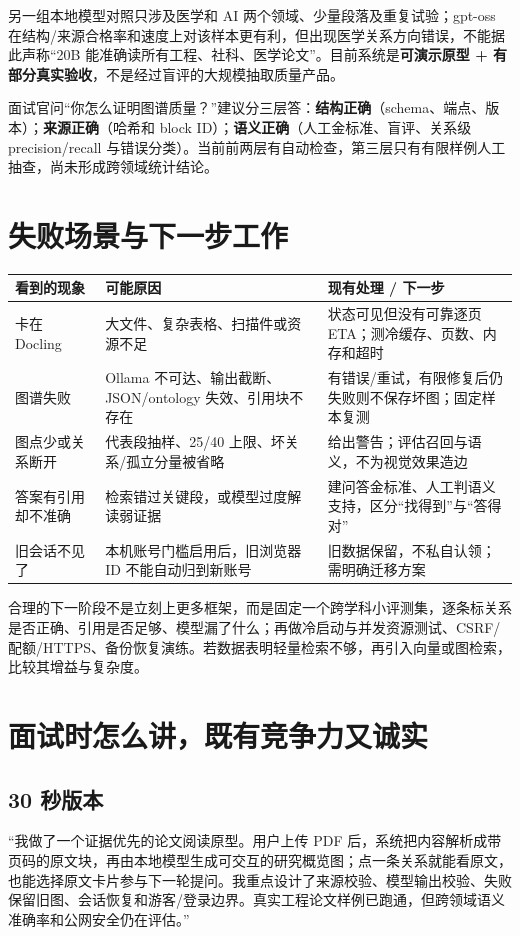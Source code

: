 \documentclass[UTF8,11pt,a4paper,fontset=fandol]{ctexart}
\newcommand{\term}[1]{\textbf{#1}}
\begin{document}
另一组本地模型对照只涉及医学和 AI 两个领域、少量段落及重复试验；gpt-oss 在结构/来源合格率和速度上对该样本更有利，但出现医学关系方向错误，不能据此声称“20B 能准确读所有工程、社科、医学论文”。目前系统是\term{可演示原型 + 有部分真实验收}，不是经过盲评的大规模抽取质量产品。

\begin{practicebox}
面试官问“你怎么证明图谱质量？”建议分三层答：\textbf{结构正确}（schema、端点、版本）；\textbf{来源正确}（哈希和 block ID）；\textbf{语义正确}（人工金标准、盲评、关系级 precision/recall 与错误分类）。当前前两层有自动检查，第三层只有有限样例人工抽查，尚未形成跨领域统计结论。
\end{practicebox}

\section{失败场景与下一步工作}

\begin{tabularx}{\textwidth}{@{}p{38mm}Y Y@{}}
\toprule
看到的现象 & 可能原因 & 现有处理 / 下一步 \\
\midrule
卡在 Docling & 大文件、复杂表格、扫描件或资源不足 & 状态可见但没有可靠逐页 ETA；测冷缓存、页数、内存和超时 \\
图谱失败 & Ollama 不可达、输出截断、JSON/ontology 失效、引用块不存在 & 有错误/重试，有限修复后仍失败则不保存坏图；固定样本复测 \\
图点少或关系断开 & 代表段抽样、25/40 上限、坏关系/孤立分量被省略 & 给出警告；评估召回与语义，不为视觉效果造边 \\
答案有引用却不准确 & 检索错过关键段，或模型过度解读弱证据 & 建问答金标准、人工判语义支持，区分“找得到”与“答得对” \\
旧会话不见了 & 本机账号门槛启用后，旧浏览器 ID 不能自动归到新账号 & 旧数据保留，不私自认领；需明确迁移方案 \\
\bottomrule
\end{tabularx}

合理的下一阶段不是立刻上更多框架，而是固定一个跨学科小评测集，逐条标关系是否正确、引用是否足够、模型漏了什么；再做冷启动与并发资源测试、CSRF/配额/HTTPS、备份恢复演练。若数据表明轻量检索不够，再引入向量或图检索，比较其增益与复杂度。

\section{面试时怎么讲，既有竞争力又诚实}

\subsection*{30 秒版本}
“我做了一个证据优先的论文阅读原型。用户上传 PDF 后，系统把内容解析成带页码的原文块，再由本地模型生成可交互的研究概览图；点一条关系就能看原文，也能选择原文卡片参与下一轮提问。我重点设计了来源校验、模型输出校验、失败保留旧图、会话恢复和游客/登录边界。真实工程论文样例已跑通，但跨领域语义准确率和公网安全仍在评估。”
\end{document}
